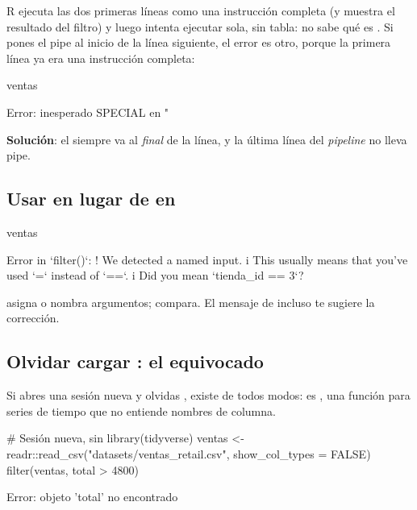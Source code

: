 R ejecuta las dos primeras líneas como una instrucción completa (y muestra
el resultado del filtro) y luego intenta ejecutar
 sola, sin tabla: no sabe qué es
. Si pones el pipe al inicio de la línea siguiente, el error
es otro, porque la primera línea ya era una instrucción completa:

\begin{rnoejecutar}
ventas
\end{rnoejecutar}
\begin{rsalida}
Error: inesperado SPECIAL en "  %
\end{rsalida}

\textbf{Solución}: el \codigo{\%>\%} siempre va al \emph{final} de la línea,
y la última línea del \emph{pipeline} no lleva pipe.

\subsection{Usar \texorpdfstring{\codigo{=}}{=} en lugar de \texorpdfstring{\codigo{==}}{==} en \texorpdfstring{}{filter()}}

\begin{rnoejecutar}
ventas %
\end{rnoejecutar}
\begin{rsalida}
Error in `filter()`:
! We detected a named input.
i This usually means that you've used `=` instead of `==`.
i Did you mean `tienda_id == 3`?
\end{rsalida}

\codigo{=} asigna o nombra argumentos; \codigo{==} compara. El mensaje de
 incluso te sugiere la corrección.

\subsection{Olvidar cargar \texorpdfstring{}{dplyr}: el \texorpdfstring{}{filter()} equivocado}

Si abres una sesión nueva y olvidas ,
 existe de todos modos: es , una
función para series de tiempo que no entiende nombres de columna.

\begin{rnoejecutar}
# Sesión nueva, sin library(tidyverse)
ventas <- readr::read_csv("datasets/ventas_retail.csv",
                          show_col_types = FALSE)
filter(ventas, total > 4800)
\end{rnoejecutar}
\begin{rsalida}
Error: objeto 'total' no encontrado
\end{rsalida}

